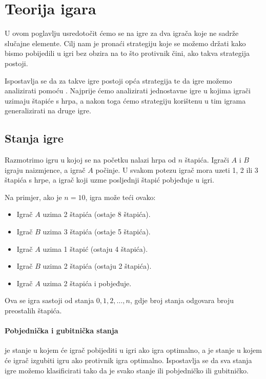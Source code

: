 \chapter{Teorija igara}

U ovom poglavlju usredotočit ćemo se na igre za
dva igrača koje ne sadrže slučajne elemente.
Cilj nam je pronaći strategiju koje se možemo
držati kako bismo pobijedili u igri
bez obzira na to što protivnik čini,
ako takva strategija postoji.

Ispostavlja se da za takve igre postoji
opća strategija
te da igre možemo analizirati pomoću .
Najprije ćemo analizirati jednostavne igre u kojima
igrači uzimaju štapiće s hrpa,
a nakon toga ćemo strategiju korištenu
u tim igrama generalizirati na druge igre.

\section{Stanja igre}

Razmotrimo igru u kojoj se na početku nalazi
hrpa od $n$ štapića.
Igrači $A$ i $B$ igraju naizmjence,
a igrač $A$ počinje.
U svakom potezu igrač mora uzeti
1, 2 ili 3 štapića s hrpe,
a igrač koji uzme posljednji štapić pobjeđuje u igri.

Na primjer, ako je $n=10$, igra može teći ovako:
\begin{itemize}[noitemsep]
\item Igrač $A$ uzima 2 štapića (ostaje 8 štapića).
\item Igrač $B$ uzima 3 štapića (ostaje 5 štapića).
\item Igrač $A$ uzima 1 štapić (ostaju 4 štapića).
\item Igrač $B$ uzima 2 štapića (ostaju 2 štapića).
\item Igrač $A$ uzima 2 štapića i pobjeđuje.
\end{itemize}

Ova se igra sastoji od stanja $0,1,2,\ldots,n$,
gdje broj stanja odgovara
broju preostalih štapića.

\subsubsection{Pobjednička i gubitnička stanja}


 je stanje u kojem će
igrač pobijediti u igri ako
igra optimalno,
a  je stanje
u kojem će igrač izgubiti igru ako
protivnik igra optimalno.
Ispostavlja se da sva stanja igre možemo
klasificirati tako da je svako stanje ili
pobjedničko ili gubitničko.

